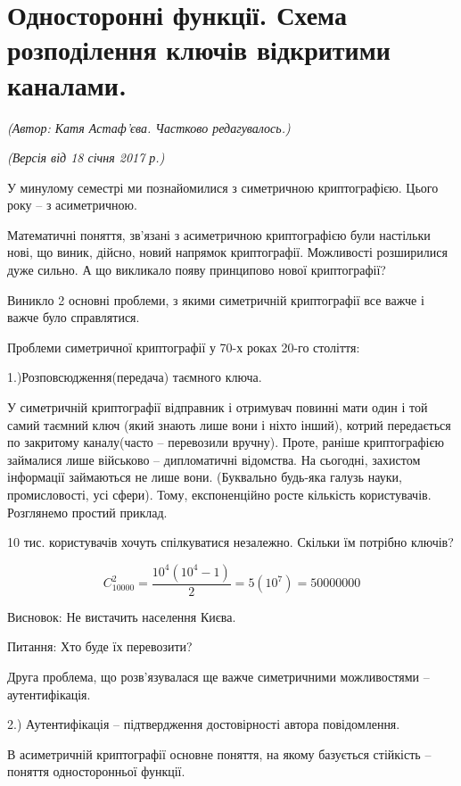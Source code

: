 \section{Односторонні функції. Схема розподілення ключів відкритими каналами.}
\begin{flushright}
\emph{(Автор: Катя Астаф'єва. Частково редагувалось.)}
\par \emph{(Версія від 18 січня 2017 р.)}
\end{flushright}

У минулому семестрі ми познайомилися з симетричною криптографією.  Цього року – з асиметричною. 

Математичні поняття, зв’язані з асиметричною криптографією були настільки нові, що виник, дійсно,  новий напрямок криптографії. Можливості розширилися дуже сильно. А що викликало появу принципово нової криптографії?

Виникло 2 основні проблеми, з якими симетричній криптографії все важче і важче було справлятися.

Проблеми симетричної криптографії у 70-х роках 20-го століття:

1.)Розповсюдження(передача) таємного ключа.

У симетричній криптографії відправник і отримувач повинні мати один і той самий таємний ключ (який знають лише вони і ніхто інший), котрий передається по закритому каналу(часто – перевозили вручну). Проте, раніше криптографією займалися лише військово – дипломатичні відомства. На сьогодні, захистом інформації займаються не лише вони. (Буквально будь-яка галузь науки, промисловості, усі сфери). Тому, експоненційно росте кількість користувачів. Розглянемо простий приклад.

\begin{example}
10 тис. користувачів хочуть спілкуватися незалежно. Скільки їм потрібно ключів?

$$C_{10000}^{2} =\frac{10^4(10^4 -1)}{2} = 5(10^7) = 50000000$$

Висновок: Не вистачить населення Києва.

Питання: Хто буде їх перевозити?
\end{example}

Друга проблема, що розв’язувалася ще важче симетричними можливостями – аутентифікація.

2.) Аутентифікація – підтвердження достовірності автора повідомлення.

В асиметричній криптографії основне поняття, на якому базується стійкість – поняття односторонньої функції. 

